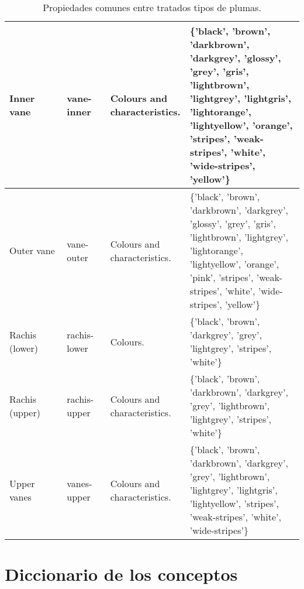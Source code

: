 \documentclass[a4paper,12pt]{article}
\begin{document}
\begin{table}[H]
\begin{tabular}{|p{0.2\linewidth}|p{0.15\linewidth}|p{0.25\linewidth}|p{0.45\linewidth}|}
		Inner vane     & vane-inner   & Colours and characteristics.                  & \{'black', 'brown', 'darkbrown', 'darkgrey', 'glossy', 'grey', 'gris', 'lightbrown', 'lightgrey', 'lightgris', 'lightorange', 'lightyellow', 'orange', 'stripes', 'weak-stripes', 'white', 'wide-stripes', 'yellow'\} \\ \hline
		Outer vane     & vane-outer   & Colours and characteristics.                  & \{'black', 'brown', 'darkbrown', 'darkgrey', 'glossy', 'grey', 'gris', 'lightbrown', 'lightgrey', 'lightorange', 'lightyellow', 'orange', 'pink', 'stripes', 'weak-stripes', 'white', 'wide-stripes', 'yellow'\}      \\ \hline
		Rachis (lower) & rachis-lower & Colours.                                      & \{'black', 'brown', 'darkgrey', 'grey', 'lightgrey', 'stripes', 'white'\}                                                                                                                                                       \\ \hline
		Rachis (upper) & rachis-upper & Colours and characteristics.                  & \{'black', 'brown', 'darkbrown', 'darkgrey', 'grey', 'lightbrown', 'lightgrey', 'stripes', 'white'\}                                                                                                                            \\ \hline
		Upper vanes    & vanes-upper  & Colours and characteristics.                  & \{'black', 'brown', 'darkbrown', 'darkgrey', 'grey', 'lightbrown', 'lightgrey', 'lightgris', 'lightyellow', 'stripes', 'weak-stripes', 'white', 'wide-stripes'\}                                                      \\ \hline
	\end{tabular}
	\caption{Propiedades comunes entre tratados tipos de plumas.}
\end{table}

\section{Diccionario de los conceptos}
\end{document}
